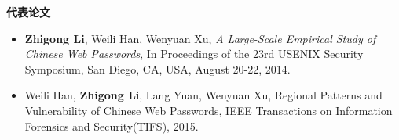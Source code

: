 \documentclass[letterpaper,10pt]{article}
\newcommand{\resheading}[1]{{\large \colorbox{mygrey}{\begin{minipage}{\textwidth}{\textbf{#1 \vphantom{p\^{E}}}}\end{minipage}}}}
\begin{document}





\resheading{代表论文}
\begin{itemize}
 \item
 \textbf{Zhigong Li}, Weili Han, Wenyuan Xu, \emph{A Large-Scale Empirical Study of Chinese Web Passwords}, In Proceedings of the 23rd {USENIX} Security Symposium, San Diego, CA, USA, August 20-22, 2014.
 \item Weili Han, \textbf{Zhigong Li}, Lang Yuan, Wenyuan Xu, Regional Patterns and Vulnerability of Chinese Web Passwords, IEEE Transactions on Information Forensics and Security(TIFS), 2015.

\end{itemize}




\end{document}
